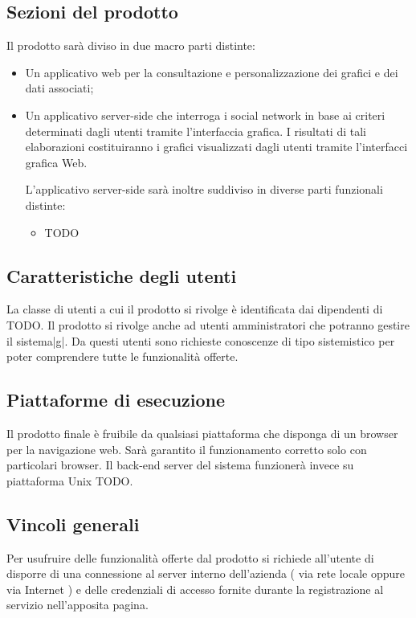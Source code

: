 \subsection{Sezioni del prodotto}
Il prodotto sarà diviso in due macro parti distinte:

\begin{itemize}
\item Un applicativo web per la consultazione e personalizzazione dei grafici e dei dati associati;
\item Un applicativo server-side che interroga i social network in base ai criteri determinati dagli utenti tramite l'interfaccia grafica. I risultati di tali elaborazioni costituiranno i grafici visualizzati dagli utenti tramite l'interfacci grafica Web.

L'applicativo server-side sarà inoltre suddiviso in diverse parti funzionali distinte:
\begin{itemize}
\item  TODO
\end{itemize}

\end{itemize}

\subsection{Caratteristiche degli utenti}
La classe di utenti a cui il prodotto si rivolge è identificata dai dipendenti di TODO. 
Il prodotto si rivolge anche ad utenti amministratori che potranno gestire il sistema|g|.
Da questi utenti sono richieste conoscenze di tipo sistemistico per poter comprendere tutte le funzionalità offerte.

\subsection{Piattaforme di esecuzione}
Il prodotto finale è fruibile da qualsiasi piattaforma che disponga di un browser per la navigazione web. Sarà garantito il funzionamento corretto solo con particolari browser.
Il back-end server del sistema funzionerà invece su piattaforma Unix TODO.

\subsection{Vincoli generali}
Per usufruire delle funzionalità offerte dal prodotto si richiede all'utente di disporre
di una connessione al server interno dell'azienda ( via rete locale oppure via Internet ) e delle credenziali di accesso fornite durante la registrazione al servizio nell'apposita pagina.
